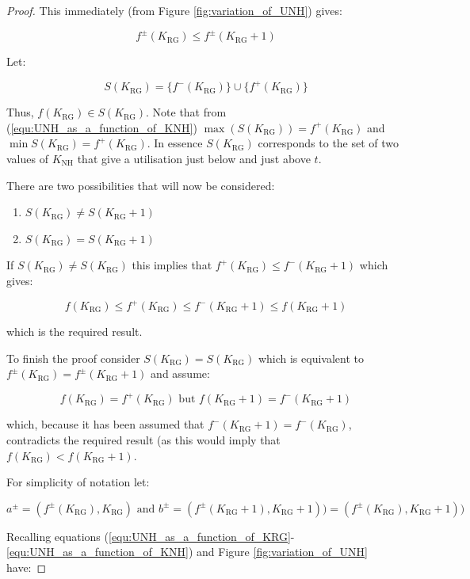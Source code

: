 \documentclass{article}
\newcommand{\NH}{\text{NH}}
\newcommand{\RG}{\text{RG}}
\begin{document}
\begin{proof}
This immediately (from Figure \ref{fig:variation_of_UNH}) gives:

\begin{equation}
f^{\pm}(K_{\RG}) \leq f^{\pm}(K_{\RG} + 1)
\end{equation}

Let:

\begin{equation}
S(K_{\RG}) = \{f^{-}(K_{\RG})\}\cup\{f^{+}(K_{\RG})\}
\end{equation}

Thus, \(f(K_{\RG})\in S(K_{\RG})\).
Note that from (\ref{equ:UNH_as_a_function_of_KNH}) \(\max (S(K_{\RG}))=f^{+}(K_{\RG})\) and \(\min S(K_{\RG})=f^{+}(K_{\RG})\).
In essence \(S(K_{\RG})\) corresponds to the set of two values of \(K_{\NH}\) that give a utilisation just below and just above \(t\).

There are two possibilities that will now be considered:

\begin{enumerate}
    \item \(S(K_{\RG})\ne S(K_{\RG}+1)\)
    \item \(S(K_{\RG})= S(K_{\RG}+1)\)
\end{enumerate}

If \(S(K_{\RG})\ne S(K_{\RG})\) this implies that \(f^{+}(K_{\RG})\leq f^{-}(K_{\RG}+1)\) which gives:

\begin{equation}
    f(K_{\RG}) \leq f^{+}(K_{\RG}) \leq f^{-}(K_{\RG}+1) \leq f(K_{\RG}+1)
\end{equation}

which is the required result.

To finish the proof consider \(S(K_{\RG})=S(K_{\RG})\) which is equivalent to \(f^{\pm}(K_{\RG})=f^{\pm}(K_{\RG}+1)\) and assume:

\begin{equation}
    f(K_{\RG})=f^{+}(K_{\RG}) \text{ but } f(K_{\RG}+1)=f^{-}(K_{\RG}+1)
\end{equation}

which, because it has been assumed that \(f^{-}(K_{\RG}+1)=f^{-}(K_{\RG})\), contradicts the required result (as this would imply that \(f(K_{\RG})< f(K_{\RG}+1)\).

For simplicity of notation let:

\[a^{\pm}=(f^{\pm}(K_{\RG}), K_{\RG})\text{ and }b^{\pm}=(f^{\pm}(K_{\RG}+1), K_{\RG}+1))=(f^{\pm}(K_{\RG}), K_{\RG}+1))\]

Recalling equations (\ref{equ:UNH_as_a_function_of_KRG}-\ref{equ:UNH_as_a_function_of_KNH}) and Figure \ref{fig:variation_of_UNH} have:


\end{proof}
\end{document}
